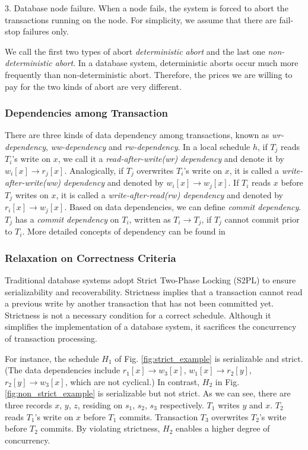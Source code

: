 \documentclass[conference]{IEEEtran}
\begin{document}
3. Database node failure.
When a node fails, the system is forced to abort the transactions running on the node. For simplicity, we assume that there are fail-stop failures only. 

We call the first two types of abort \emph{deterministic abort} and the last one \emph{non-deterministic abort}.
In a database system, deterministic aborts occur much more frequently than non-deterministic abort.
Therefore, the prices we are willing to pay for the two kinds of abort are very different.

\subsubsection{Dependencies among Transaction}

There are three kinds of data dependency among transactions, known as
\emph{wr-dependency},
\emph{ww-dependency}
and \emph{rw-dependency}.
In a local schedule ${h}$, if ${T_j}$ reads ${T_i}$'s write on ${x}$,
we call it a \emph{read-after-write(wr) dependency} and denote it by ${w_i[x] \rightarrow r_j[x]}$.
Analogically, if ${T_j}$ overwrites ${T_i}$'s write on ${x}$, it is called a \emph{write-after-write(ww) dependency} and denoted by ${w_i[x] \rightarrow w_j[x]}$.
If ${T_i}$ reads ${x}$ before ${T_j}$ writes on ${x}$, it is called a \emph{write-after-read(rw) dependency} and denoted by ${r_i[x] \rightarrow w_j[x]}$.
Based on data dependencies, we can define \emph{commit dependency}. ${T_j}$ has a \emph{commit dependency} on ${T_i}$, written as ${T_i \rightarrow T_j}$, if ${T_j}$ cannot commit prior to ${T_i}$.
More detailed concepts of dependency can be found in \cite{Dependency:conf/sigmod/ChrysanthisR90} \cite{Dependency:conf/sigmod/BilirisDGJR94}

\subsubsection{Relaxation on Correctness Criteria}

Traditional database systems adopt Strict Two-Phase Locking (S2PL) \cite{DBLP:conf/vldb/Raz92} to ensure serializability and recoverability.
Strictness implies that a transaction cannot read a previous write by another transaction that has not been committed yet.
Strictness is not a necessary condition for a correct schedule.
Although it simplifies the implementation of a database system, it sacrifices the concurrency of transaction processing.

For instance, the schedule ${H_1}$ of Fig. \ref{fig:strict_example} is serializable and strict.
(The data dependencies include ${r_1[x] \rightarrow w_3[x]}$, ${w_1[x] \rightarrow r_2[y]}$, ${r_2[y] \rightarrow w_3[x]}$, which are not cyclical.)
In contrast, ${H_2}$ in Fig. \ref{fig:non_strict_example} is serializable but not strict.
As we can see, there are three records ${x}$, ${y}$, ${z}$, residing on ${s_1}$, ${s_2}$, ${s_3}$ respectively.
${T_1}$ writes ${y}$ and ${x}$.
${T_2}$ reads ${T_1}$'s write on ${x}$ before ${T_1}$ commits.
Transaction ${T_3}$ overwrites ${T_2}$'s write before ${T_2}$ commits.
By violating strictness, ${H_2}$  enables a higher degree of concurrency.
\end{document}
